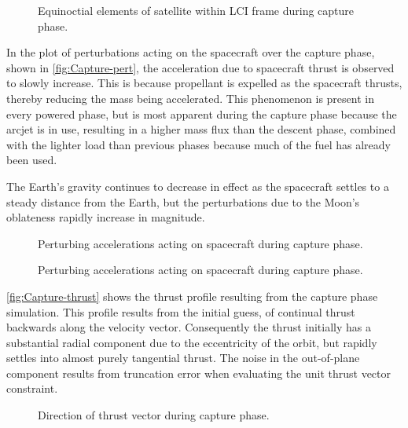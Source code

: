\begin{figure}
\centering
\def\svgwidth{\figurewidth}

\caption{Equinoctial elements of satellite within LCI frame during capture phase.}
\label{fig:Capture-mee}
\end{figure}

In the plot of perturbations acting on the spacecraft over the capture phase, shown in \autoref{fig:Capture-pert}, the acceleration due to spacecraft thrust is observed to slowly increase. This is because propellant is expelled as the spacecraft thrusts, thereby reducing the mass being accelerated. This phenomenon is present in every powered phase, but is most apparent during the capture phase because the arcjet is in use, resulting in a higher mass flux than the descent phase, combined with the lighter load than previous phases because much of the fuel has already been used.

The Earth's gravity continues to decrease in effect as the spacecraft settles to a steady distance from the Earth, but the perturbations due to the Moon's oblateness rapidly increase in magnitude. 

\begin{figure}
\centering
\def\svgwidth{\figurewidth}

\caption{Perturbing accelerations acting on spacecraft during capture phase.}
\label{fig:Capture-pert}
\end{figure}

\begin{figure}
\centering
\def\svgwidth{\figurewidth}

\caption{Perturbing accelerations acting on spacecraft during capture phase.}
\label{fig:Capture-pert2}
\end{figure}

\autoref{fig:Capture-thrust} shows the thrust profile resulting from the capture phase simulation. This profile results from the initial guess, of continual thrust backwards along the velocity vector. Consequently the thrust initially has a substantial radial component due to the eccentricity of the orbit, but rapidly settles into almost purely tangential thrust. The noise in the out-of-plane component results from truncation error when evaluating the unit thrust vector constraint.

\begin{figure}
\centering
\def\svgwidth{\figurewidth}

\caption{Direction of thrust vector during capture phase.}
\label{fig:Capture-thrust}
\end{figure}

